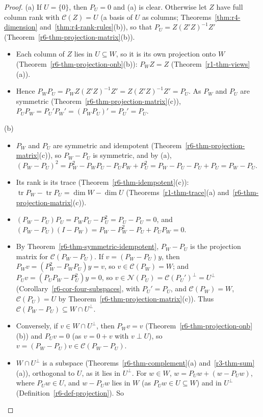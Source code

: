 \documentclass[12pt]{article}
\DeclareMathOperator{\tr}{tr}
\theoremstyle{definition}
\begin{document}
\begin{proof}
(a) If \(U=\{0\}\), then \(P_U=0\) and (a) is clear. Otherwise let \(Z\) have full column rank with
\(\mathcal C(Z)=U\) (a basis of \(U\) as columns; Theorems~\ref{thm:r4-dimension} and~\ref{thm:r4-rank-rules}(b)),
so that \(P_U=Z(Z'Z)^{-1}Z'\) (Theorem~\ref{r6-thm-projection-matrix}(b)).
\begin{itemize}
\item Each column of \(Z\) lies in \(U\subseteq W\), so it is its own projection onto \(W\)
(Theorem~\ref{r6-thm-projection-onb}(b)): \(P_WZ=Z\) (Theorem~\ref{r1-thm-views}(a)).
\item Hence \(P_WP_U=P_WZ(Z'Z)^{-1}Z'=Z(Z'Z)^{-1}Z'=P_U\). As \(P_W\) and \(P_U\) are symmetric
(Theorem~\ref{r6-thm-projection-matrix}(c)), \(P_UP_W=P_U'P_W'=(P_WP_U)'=P_U'=P_U\).
\end{itemize}
(b)
\begin{itemize}
\item \(P_W\) and \(P_U\) are symmetric and idempotent (Theorem~\ref{r6-thm-projection-matrix}(c)), so \(P_W-P_U\)
is symmetric, and by (a), \((P_W-P_U)^2=P_W^2-P_WP_U-P_UP_W+P_U^2=P_W-P_U-P_U+P_U=P_W-P_U\).
\item Its rank is its trace (Theorem~\ref{r6-thm-idempotent}(c)):
\(\tr P_W-\tr P_U=\dim W-\dim U\) (Theorems~\ref{r1-thm-trace}(a) and~\ref{r6-thm-projection-matrix}(c)).
\item \((P_W-P_U)P_U=P_WP_U-P_U^2=P_U-P_U=0\), and \((P_W-P_U)(I-P_W)=P_W-P_W^2-P_U+P_UP_W=0\).
\item By Theorem~\ref{r6-thm-symmetric-idempotent}, \(P_W-P_U\) is the projection matrix for
\(\mathcal C(P_W-P_U)\). If \(v=(P_W-P_U)y\), then \(P_Wv=(P_W^2-P_WP_U)y=v\), so \(v\in\mathcal C(P_W)=W\); and
\(P_Uv=(P_UP_W-P_U^2)y=0\), so \(v\in\mathcal N(P_U)=\mathcal C(P_U')^\perp=U^\perp\)
(Corollary~\ref{r6-cor-four-subspaces}, with \(P_U'=P_U\), and \(\mathcal C(P_W)=W\), \(\mathcal C(P_U)=U\) by
Theorem~\ref{r6-thm-projection-matrix}(c)). Thus \(\mathcal C(P_W-P_U)\subseteq W\cap U^\perp\).
\item Conversely, if \(v\in W\cap U^\perp\), then \(P_Wv=v\) (Theorem~\ref{r6-thm-projection-onb}(b)) and
\(P_Uv=0\) (as \(v=0+v\) with \(v\perp U\)), so \(v=(P_W-P_U)v\in\mathcal C(P_W-P_U)\).
\item \(W\cap U^\perp\) is a subspace (Theorems~\ref{r6-thm-complement}(a) and~\ref{r3-thm-sum}(a)), orthogonal to
\(U\), as it lies in \(U^\perp\). For \(w\in W\), \(w=P_Uw+(w-P_Uw)\), where \(P_Uw\in U\), and \(w-P_Uw\) lies
in \(W\) (as \(P_Uw\in U\subseteq W\)) and in \(U^\perp\) (Definition~\ref{r6-def-projection}). So

\end{itemize}
\end{proof}
\end{document}
